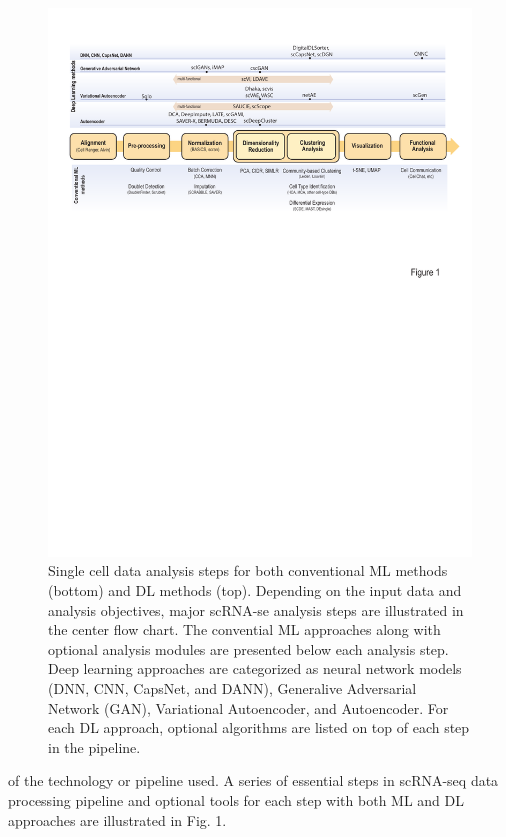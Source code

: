 \documentclass[
]{book}
\begin{document}
\begin{figure}

{\centering \includegraphics{Figures/Figure1} 

}

\caption{Single cell data analysis steps for both conventional ML methods (bottom) and DL methods (top). Depending on the input data and analysis objectives, major scRNA-se analysis steps are illustrated in the center flow chart. The convential ML approaches along with optional analysis modules are presented below each analysis step. Deep learning approaches are categorized as neural network models (DNN, CNN, CapsNet, and DANN), Generalive Adversarial Network (GAN), Variational Autoencoder, and Autoencoder. For each DL approach, optional algorithms are listed on top of each step in the pipeline.}\label{fig:Figure1}
\end{figure}

of the technology or pipeline used. A series of essential steps in scRNA-seq data processing pipeline and optional tools for each step with both ML and DL approaches are illustrated in Fig. 1.
\end{document}
